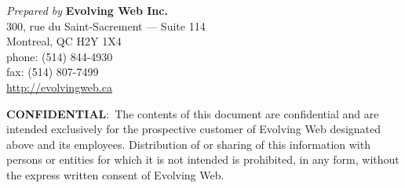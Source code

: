 \begin{titlingpage}
  \maketitle
  \vfill
\end{titlingpage}

\pagebreak

\thispagestyle{empty}

\emph{Prepared by} \textbf{Evolving Web Inc.} \\
300, rue du Saint-Sacrement --- Suite 114 \\
Montreal, QC H2Y 1X4 \\
phone: (514) 844-4930 \\
fax: (514) 807-7499 \\
\href{http://evolvingweb.ca}{http://evolvingweb.ca}

\vfill
\textbf{CONFIDENTIAL}:~The contents of this document are confidential
and are intended exclusively for the prospective customer of Evolving
Web designated above and its employees. Distribution of or sharing of
this information with persons or entities for which it is not intended
is prohibited, in any form, without the express written consent of
Evolving Web.
\pagebreak
